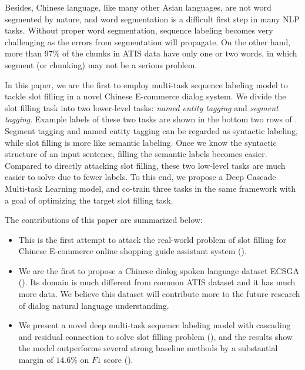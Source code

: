 Besides, Chinese language, like many other Asian languages, are not
word segmented by nature, and word segmentation is a difficult
first step in many NLP tasks.
Without proper word segmentation, sequence labeling becomes very challenging
as the errors from segmentation will propagate.
On the other hand, more than 97\% of the chunks in ATIS data 
have only one or two words,
in which segment (or chunking) may not be a serious problem.

In this paper, we are the first to employ multi-task sequence labeling model
to tackle slot filling in a novel Chinese E-commerce dialog system.
We divide the slot filling task into two lower-level tasks: 
{\em named entity tagging} and {\em segment tagging}.
Example labels of these two tasks 
are shown in the bottom two rows of .
Segment tagging and named entity tagging can be regarded as 
syntactic labeling, 
while slot filling is more like semantic labeling.
Once we know the syntactic structure of an input sentence,
filling the semantic labels becomes easier.
Compared to directly attacking slot filling,
these two low-level tasks are much easier to solve
due to fewer labels.
To this end, we propose a Deep Cascade Multi-task Learning model,
and co-train three tasks in the same framework
with a goal of optimizing the target slot filling task.

The contributions of this paper are summarized below:
\begin{itemize}
	\itemsep0em
	\item This is the first attempt to attack the real-world problem of 
	slot filling for Chinese E-commerce online shopping guide assistant system ().
	\item We are the first to propose a Chinese dialog spoken language dataset ECSGA ().
	Its domain is much different from common ATIS dataset and it has much more data.
	We believe this dataset will contribute more to the future research of dialog natural language understanding.
	\item We present a novel deep multi-task sequence labeling model with cascading and 
	residual connection to solve slot filling problem
	(), and the results 
	show the model outperforms 
	several strong baseline methods 
	by a substantial margin of $14.6\%$ on $F1$ score (). 
\end{itemize}
